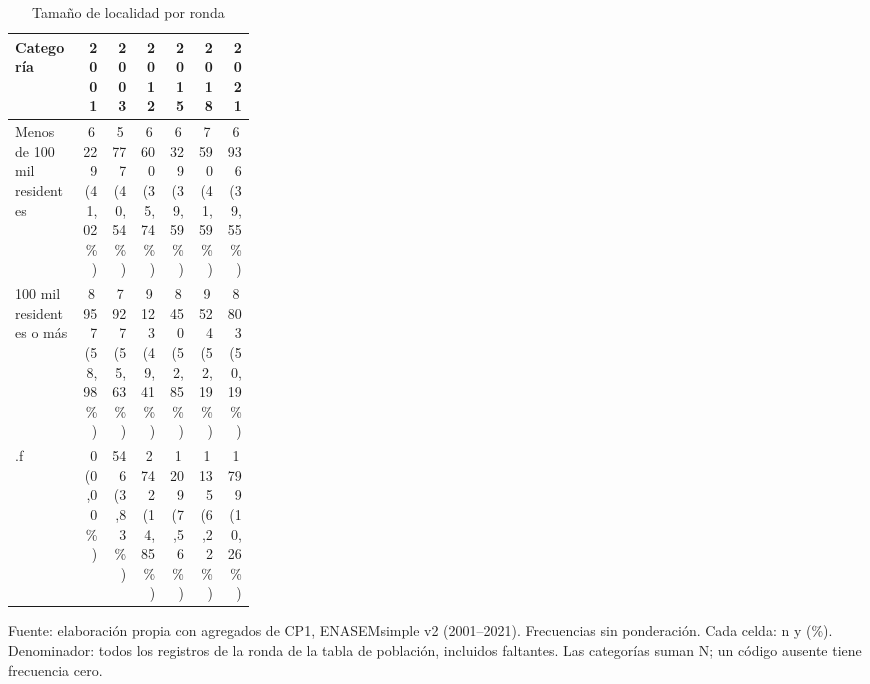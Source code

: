 \begin{table}[!htbp]
\centering
\caption{Tamaño de localidad por ronda}\label{tab:cp1-urbano}
\small\setlength{\tabcolsep}{4pt}
\renewcommand{\arraystretch}{1.15}
\begin{tabular}{p{0.28\linewidth}rrrrrr}
\toprule
\textbf{Categoría} & \textbf{2001} & \textbf{2003} & \textbf{2012} & \textbf{2015} & \textbf{2018} & \textbf{2021} \\
\midrule
Menos de 100 mil residentes & \shortstack[r]{6\,229\\(41,02\%)} & \shortstack[r]{5\,777\\(40,54\%)} & \shortstack[r]{6\,600\\(35,74\%)} & \shortstack[r]{6\,329\\(39,59\%)} & \shortstack[r]{7\,590\\(41,59\%)} & \shortstack[r]{6\,936\\(39,55\%)} \\
100 mil residentes o más & \shortstack[r]{8\,957\\(58,98\%)} & \shortstack[r]{7\,927\\(55,63\%)} & \shortstack[r]{9\,123\\(49,41\%)} & \shortstack[r]{8\,450\\(52,85\%)} & \shortstack[r]{9\,524\\(52,19\%)} & \shortstack[r]{8\,803\\(50,19\%)} \\
.f & \shortstack[r]{0\\(0,00\%)} & \shortstack[r]{546\\(3,83\%)} & \shortstack[r]{2\,742\\(14,85\%)} & \shortstack[r]{1\,209\\(7,56\%)} & \shortstack[r]{1\,135\\(6,22\%)} & \shortstack[r]{1\,799\\(10,26\%)} \\
\bottomrule
\end{tabular}
\par\medskip
\parbox{\linewidth}{\footnotesize Fuente: elaboración propia con agregados de CP1, ENASEMsimple v2 (2001--2021). Frecuencias sin ponderación. Cada celda: n y (\%). Denominador: todos los registros de la ronda de la tabla de población, incluidos faltantes. Las categorías suman N; un código ausente tiene frecuencia cero.}
\end{table}
